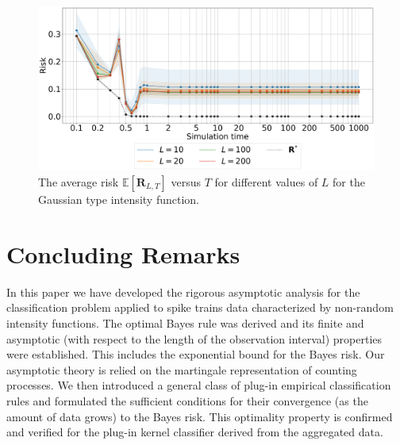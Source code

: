\documentclass[lettersize,journal,onecolumn]{IEEEtran}
\theoremstyle{definition}
\newcommand{\figurewidth}{0.5\columnwidth}  %
\newcommand{\E}[1]{\mathbb{E}\left[#1\right]}
\begin{document}
\begin{figure}[!t]
	\includegraphics[width=\figurewidth]{pawla6}
	\centering
	\caption{
		The average risk $\E{\mathbf{R}_{L,T}}$ versus $T$ for different values of $L$ 
		for the Gaussian type intensity function.
	}
	\label{fig:05_simulations/sims/failure}
\end{figure}

\section{Concluding Remarks}
\label{sec:06_conclusions}

\noindent In this paper we have developed the rigorous asymptotic analysis for the 
classification
problem applied to spike trains data characterized by non-random intensity functions. The
optimal Bayes rule was derived and its finite and asymptotic (with respect to the length 
of the observation interval) properties were established. This includes the exponential 
bound for the Bayes risk. Our asymptotic theory is relied on the martingale 
representation of counting processes. We then introduced a general class of plug-in 
empirical classification rules and formulated the sufficient conditions for their 
convergence (as the amount of data grows) to the Bayes risk. This optimality property is 
confirmed and verified for the plug-in kernel classifier derived from the aggregated 
data. 
\end{document}
